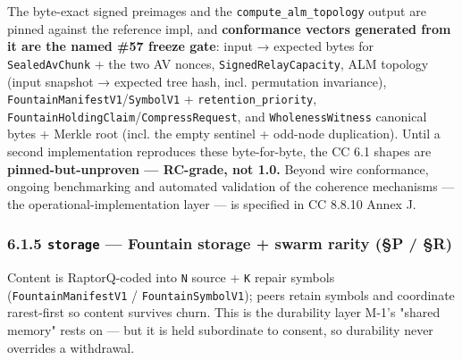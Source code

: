 \documentclass[11pt]{article}
\begin{document}
The byte-exact signed preimages and the \texttt{compute\_alm\_topology} output are pinned against the reference impl, and \textbf{conformance vectors generated from it are the named \#57 freeze gate}: input → expected bytes for \texttt{SealedAvChunk} + the two AV nonces, \texttt{SignedRelayCapacity}, ALM topology (input snapshot → expected tree hash, incl. permutation invariance), \texttt{FountainManifestV1}/\texttt{SymbolV1} + \texttt{retention\_priority}, \texttt{FountainHoldingClaim}/\texttt{CompressRequest}, and \texttt{WholenessWitness} canonical bytes + Merkle root (incl. the empty sentinel + odd-node duplication). Until a second implementation reproduces these byte-for-byte, the CC 6.1 shapes are \textbf{pinned-but-unproven — RC-grade, not 1.0.} Beyond wire conformance, ongoing benchmarking and automated validation of the coherence mechanisms — the operational-implementation layer — is specified in CC 8.8.10 Annex J.


\subsubsection*{6.1.5 \texttt{storage} — Fountain storage + swarm rarity (§P / §R)}


Content is RaptorQ-coded into \texttt{N} source + \texttt{K} repair symbols (\texttt{FountainManifestV1} / \texttt{FountainSymbolV1}); peers retain symbols and coordinate rarest-first so content survives churn. This is the durability layer M-1's "shared memory" rests on — but it is held subordinate to consent, so durability never overrides a withdrawal.
\end{document}
